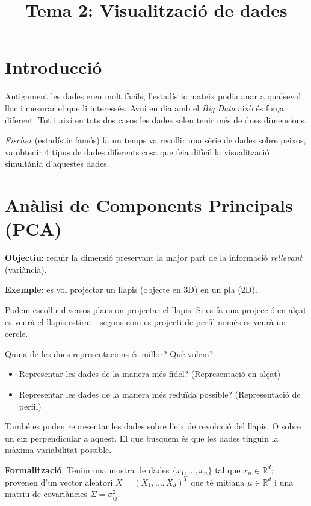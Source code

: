 \documentclass[a4paper]{article}
\begin{document}
	\title{Tema 2: Visualització de dades}
	\maketitle
	
	\section{Introducció}
	
	Antigament les dades eren molt fàcils, l'estadístic mateix podia anar a qualsevol lloc i mesurar el que li interessés. Avui en dia amb el \emph{Big Data} això és força diferent. Tot i així en tots dos casos les dades solen tenir més de dues dimensions. 
	
	\emph{Fischer} (estadístic famós) fa un temps va recollir una sèrie de dades sobre peixos, va obtenir 4 tipus de dades diferents cosa que feia difícil la visualització simultània d'aquestes dades.
	
	\section{Anàlisi de Components Principals (PCA)}
	
	\textbf{Objectiu}: reduir la dimensió preservant la major part de la informació \emph{rellevant} (variància). 
	
	\textbf{Exemple}: es vol projectar un llapis (objecte en 3D) en un pla (2D).
	
	Podem escollir diversos plans on projectar el llapis. Si es fa una projecció en alçat es veurà el llapis estirat i segons com es projecti de perfil només es veurà un cercle.
	
	Quina de les dues representacions és millor? Què volem? 
	\begin{itemize}
		\item Representar les dades de la manera més fidel? (Representació en alçat)
		\item Representar les dades de la manera més reduïda possible? (Representació de perfil)
	\end{itemize}
	
	També es poden representar les dades sobre l'eix de revolució del llapis. O sobre un eix perpendicular a aquest. El que busquem és que les dades tinguin la màxima variabilitat possible.
	
	\textbf{Formalització}: Tenim una mostra de dades $\{x_1, ..., x_n\}$ tal que $x_n \in \mathbb{R}^d$; provenen d'un vector aleatori $X = (X_1, ..., X_d)^T$ que té mitjana $\mu \in \mathbb{R}^d$ i una matriu de covariàncies $\Sigma = \sigma_{ij}^2$.
	
\end{document}
